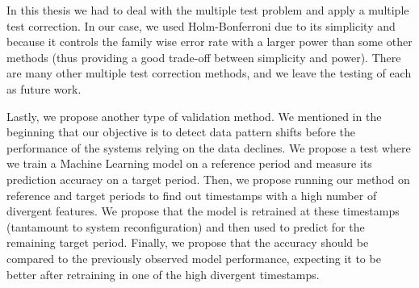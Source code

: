 In this thesis we had to deal with the multiple test problem and apply a multiple test correction. In our case, we used Holm-Bonferroni due to its simplicity and because it controls the family wise error rate with a larger power than some other methods (thus providing a good trade-off between simplicity and power). There are many other multiple test correction methods, and we leave the testing of each as future work.

Lastly, we propose another type of validation method. We mentioned in the beginning that our objective is to detect data pattern shifts before the performance of the systems relying on the data declines. We propose a test where we train a Machine Learning model on a reference period and measure its prediction accuracy on a target period. Then, we propose running our method on reference and target periods to find out timestamps with a high number of divergent features. We propose that the model is retrained at these timestamps (tantamount to system reconfiguration) and then used to predict for the remaining target period. Finally, we propose that the accuracy should be compared to the previously observed model performance, expecting it to be better after retraining in one of the high divergent timestamps.
